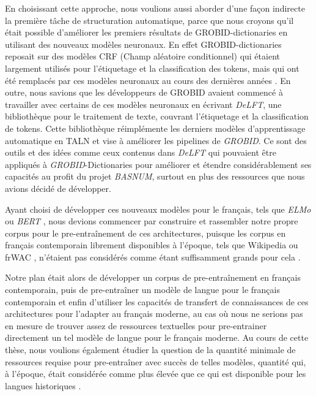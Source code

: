 En choisissant cette approche, nous voulions aussi aborder d'une façon indirecte la première tâche de structuration automatique, parce que nous croyons qu'il était possible d'améliorer les premiers résultats de GROBID-dictionaries en utilisant des nouveaux modèles neuronaux. En effet GROBID-dictionaries reposait sur des modèles CRF (Champ aléatoire conditionnel) \cite{lafferty-etal-2001-conditional} qui étaient largement utilisés pour l'étiquetage et la classification des tokens, mais qui ont été remplacés par ces modèles neuronaux au cours des dernières années \citep{lample-etal-2016-neural,devlin-etal-2019-bert}. En outre, nous savions que les développeurs de GROBID avaient commencé à travailler avec certains de ces modèles neuronaux en écrivant \emph{DeLFT}, une bibliothèque pour le traitement de texte, couvrant l'étiquetage et la classification de tokens. Cette bibliothèque réimplémente les derniers modèles d'apprentissage automatique en TALN \citep{lopez-etal-2018-delft} et vise à améliorer les pipelines de \emph{GROBID}. Ce sont des outils et des idées comme ceux contenus dans \emph{DeLFT} qui pouvaient être appliqués à \emph{GROBID}-Dictionaries pour améliorer et étendre considérablement ses capacités au profit du projet \emph{BASNUM}, surtout en plus des ressources que nous avions décidé de développer.

Ayant choisi de développer ces nouveaux modèles pour le français, tels que \emph{ELMo} \citep{peters-etal-2018-deep} ou \emph{BERT} \cite{devlin-etal-2019-bert}, nous devions commencer par construire et rassembler notre propre corpus pour le pre-entraînement de ces architectures, puisque les corpus en français contemporain librement disponibles à l'époque, tels que Wikipedia ou frWAC \citep{baroni-etal-2009-the}, n'étaient pas considérés comme étant suffisamment grands pour cela \citep{liu-etal-2019-roberta}.

Notre plan était alors de développer un corpus de pre-entraînement en français contemporain, puis de pre-entraîner un modèle de langue pour le français contemporain et enfin d'utiliser les capacités de transfert de connaissances de ces architectures pour l'adapter au français moderne, au cas où nous ne serions pas en mesure de trouver assez de ressources textuelles pour pre-entrainer directement un tel modèle de langue pour le français moderne. Au cours de cette thèse, nous voulions également étudier la question de la quantité minimale de ressources requise pour pre-entraîner avec succès de telles modèles, quantité qui, à l'époque, était considérée comme plus élevée que ce qui est disponible pour les langues historiques \citep{peters-etal-2018-deep,liu-etal-2019-roberta}.

